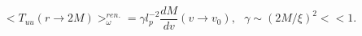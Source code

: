 \begin{equation}
<T_{uu}(r\rightarrow 2M)>^{ren.}_{\omega}=\gamma l^{-2}_p
\frac{dM}{dv} (v\rightarrow v_0),~~~ \gamma\sim(2M/\xi)^2<<1.
\label{20}\end{equation}

